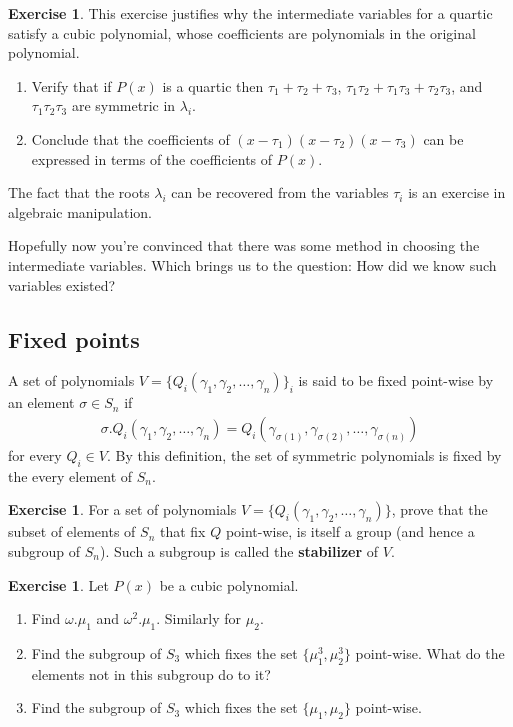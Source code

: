 \documentclass[reqno, 12pt, letter]{article}
\theoremstyle{plain}
\theoremstyle{definition}
\newtheorem{exercise}[theorem]{Exercise}
\theoremstyle{remark}
\numberwithin{equation}{section}
\begin{document}
	\begin{exercise}
		This exercise justifies why the intermediate variables for a quartic satisfy a cubic polynomial, whose coefficients are polynomials in the original polynomial.		\begin{enumerate}
			\item Verify that if $ P(x)$ is a quartic then $ \tau_1 + \tau_2 + \tau_3$, $ \tau_1 \tau_2 + \tau_1 \tau_3 + \tau_2 \tau_3$, and $ \tau_1 \tau_2 \tau_3$ are symmetric in $ \lambda_i$. 
			\item Conclude that the coefficients of $ (x-\tau_1)(x-\tau_2)(x-\tau_3)$ can be expressed in terms of the coefficients of $ P(x)$.
		\end{enumerate}
		The fact that the roots $ \lambda_i$ can be recovered from the variables $ \tau_i$ is an exercise in algebraic manipulation.
	\end{exercise}
	
	Hopefully now you're convinced that there was some method in choosing the intermediate variables. Which brings us to the question: How did we know such variables existed?
	
	
	
	
	
	
	\subsection{Fixed points}
		A set of polynomials $ V = \{ Q_i(\gamma_1, \gamma_2, \dots, \gamma_n) \}_i$ is said to be fixed point-wise by an element $ \sigma \in S_n$ if 
			\begin{align*}
				\sigma.Q_i(\gamma_1, \gamma_2, \dots, \gamma_n) = Q_i(\gamma_{\sigma(1)}, \gamma_{\sigma(2)}, \dots, \gamma_{\sigma(n)})
			\end{align*}
		for every $ Q_i \in V$. By this definition, the set of symmetric polynomials is fixed by the every element of $ S_n$. 
		
		\begin{exercise}
			For a set of polynomials $ V = \{ Q_i(\gamma_1, \gamma_2, \dots, \gamma_n) \}$, prove that the subset of elements of $ S_n$ that fix $ Q$ point-wise, is itself a group (and hence a subgroup of $ S_n$). Such a subgroup is called the \textbf{stabilizer} of $ V$.
		\end{exercise}
		
		\begin{exercise} Let $ P(x)$ be a cubic polynomial. 
			\begin{enumerate}
				\item Find $ \omega . \mu_1$ and $ \omega^2. \mu_1$. Similarly for $ \mu_2$.
				\item Find the subgroup of $ S_3$ which fixes the set $\{ \mu_1^3, \mu_2^3 \}$ point-wise. What do the elements not in this subgroup do to it? 
				\item Find the subgroup of $ S_3$ which fixes the set $\{ \mu_1, \mu_2 \}$ point-wise.
			\end{enumerate}
		\end{exercise}
		
\end{document}
